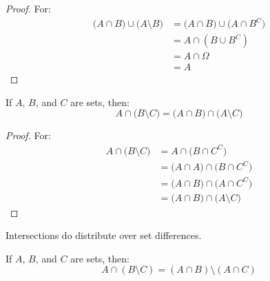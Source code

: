             \begin{proof}
                For:
                \begin{subequations}
                    \begin{align}
                        \big(A\cap{B})\cup\big(A\setminus{B}\big)
                        &=\big(A\cap{B}\big)\cup\big(A\cap{B}^{C}\big)\\
                        &=A\cap(B\cup{B}^{C})\\
                        &=A\cap\Omega\\
                        &=A
                    \end{align}
                \end{subequations}
            \end{proof}
            \begin{theorem}
                If $A$, $B$, and $C$ are sets, then:
                \begin{equation}
                    A\cap\big(B\setminus{C}\big)
                    =\big(A\cap{B}\big)\cap\big(A\setminus{C}\big)
                \end{equation}
            \end{theorem}
            \begin{proof}
                For:
                \begin{subequations}
                    \begin{align}
                        A\cap\big(B\setminus{C}\big)
                        &=A\cap\big(B\cap{C}^{C}\big)\\
                        &=\big(A\cap{A}\big)\cap\big(B\cap{C}^{C}\big)\\
                        &=\big(A\cap{B}\big)\cap\big(A\cap{C}^{C}\big)\\
                        &=\big(A\cap{B}\big)\cap\big(A\setminus{C}\big)
                    \end{align}
                \end{subequations}
            \end{proof}
            Intersections do distribute over set differences.
            \begin{theorem}
                If $A$, $B$, and $C$ are sets, then:
                \begin{equation}
                    A\cap(B\setminus{C})=
                    (A\cap{B})\setminus(A\cap{C})
                \end{equation}
            \end{theorem}

